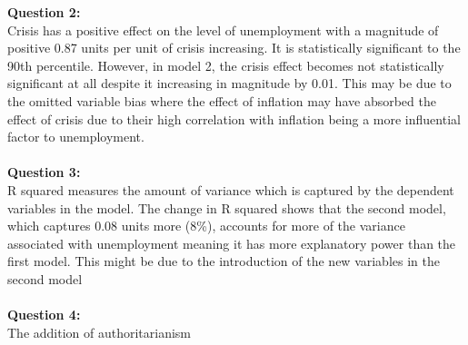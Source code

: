 \documentclass[12pt, letterpaper]{article}
\begin{document}
\textbf{Question 2:}\\
Crisis has a positive effect on the level of unemployment with a magnitude of positive 0.87 units per unit of crisis increasing. It is statistically significant to the 90th percentile. However, in model 2, the crisis effect becomes not statistically significant at all despite it increasing in magnitude by 0.01. This may be due to the omitted variable bias where the effect of inflation may have absorbed the effect of crisis due to their high correlation with inflation being a more influential factor to unemployment.\\\\
\textbf{Question 3:}\\
R squared measures the amount of variance which is captured by the dependent variables in the model. The change in R squared shows that the second model, which captures 0.08 units more (8\%), accounts for more of the variance associated with unemployment meaning it has more explanatory power than the first model. This might be due to the introduction of the new variables in the second model \\\\
\textbf{Question 4:}\\
The addition of authoritarianism
\\\\
\begin{center}

\noindent{}


\end{center}
\end{document}
